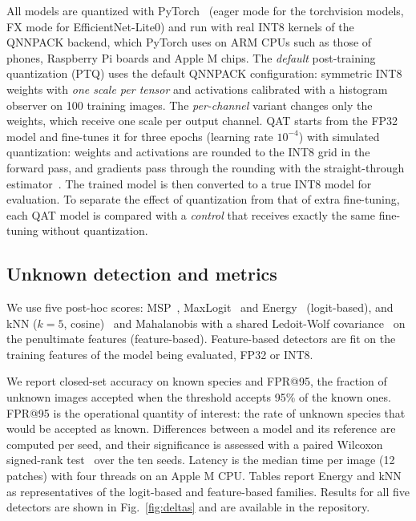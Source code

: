 \documentclass[conference]{IEEEtran}
\begin{document}
All models are quantized with PyTorch~\cite{paszke2019pytorch} (eager mode for the torchvision models, FX mode for EfficientNet-Lite0) and run with real INT8 kernels of the QNNPACK backend, which PyTorch uses on ARM CPUs such as those of phones, Raspberry Pi boards and Apple M chips. The \emph{default} post-training quantization (PTQ) uses the default QNNPACK configuration: symmetric INT8 weights with \emph{one scale per tensor} and activations calibrated with a histogram observer on 100 training images. The \emph{per-channel} variant changes only the weights, which receive one scale per output channel. QAT starts from the FP32 model and fine-tunes it for three epochs (learning rate $10^{-4}$) with simulated quantization: weights and activations are rounded to the INT8 grid in the forward pass, and gradients pass through the rounding with the straight-through estimator~\cite{jacob2018quantization}. The trained model is then converted to a true INT8 model for evaluation. To separate the effect of quantization from that of extra fine-tuning, each QAT model is compared with a \emph{control} that receives exactly the same fine-tuning without quantization.

\subsection{Unknown detection and metrics}

We use five post-hoc scores: MSP~\cite{hendrycks2017baseline}, MaxLogit~\cite{hendrycks2022scaling} and Energy~\cite{liu2020energy} (logit-based), and kNN ($k=5$, cosine)~\cite{sun2022knn} and Mahalanobis with a shared Ledoit-Wolf covariance~\cite{lee2018simple,ledoit2004well} on the penultimate features (feature-based). Feature-based detectors are fit on the training features of the model being evaluated, FP32 or INT8.

We report closed-set accuracy on known species and FPR@95, the fraction of unknown images accepted when the threshold accepts 95\% of the known ones. FPR@95 is the operational quantity of interest: the rate of unknown species that would be accepted as known. Differences between a model and its reference are computed per seed, and their significance is assessed with a paired Wilcoxon signed-rank test~\cite{wilcoxon1945individual} over the ten seeds. Latency is the median time per image (12 patches) with four threads on an Apple M CPU. Tables report Energy and kNN as representatives of the logit-based and feature-based families. Results for all five detectors are shown in Fig.~\ref{fig:deltas} and are available in the repository.
\end{document}
